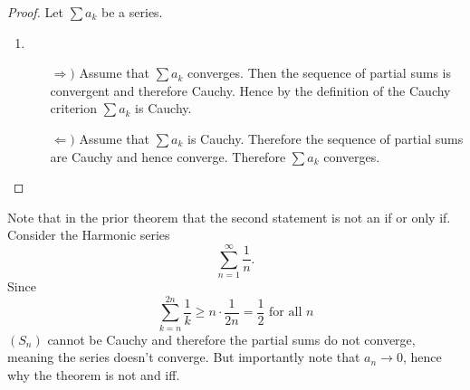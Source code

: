 \documentclass[../notes.tex]{subfiles}
\begin{document}
\begin{proof}
    Let $\sum a_k$ be a series.
    \begin{enumerate}
        \item
            \begin{enumerate}
                \item[$\Rightarrow)$] Assume that $\sum a_k$ converges. Then the sequence of partial sums is convergent and therefore Cauchy. Hence by the definition of the Cauchy criterion $\sum a_k$ is Cauchy.
                \item[$\Leftarrow)$] Assume that $\sum a_k$ is Cauchy. Therefore the sequence of partial sums are Cauchy and hence converge. Therefore $\sum a_k$ converges.
            \end{enumerate}
    \end{enumerate}
\end{proof}

\begin{remark}
    Note that in the prior theorem that the second statement is not an if or only if. Consider the Harmonic series
    \[
        \sum_{n = 1}^\infty \frac{1}{n}
    .\]
    Since
    \[
        \sum_{k = n}^{2n} \frac{1}{k} \geq n\cdot \frac{1}{2n} = \frac{1}{2} \text{ for all $n$}
    \]
    $(S_n)$ cannot be Cauchy and therefore the partial sums do not converge, meaning the series doesn't converge. But importantly note that $a_n \to 0$, hence why the theorem is not and iff.
\end{remark}
\end{document}
